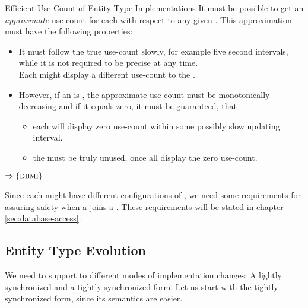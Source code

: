 \documentclass[a4paper, 12pt]{book}
\newcommand{\INTERFACE}[1]{$\Rightarrow\left\{#1\right\}$}
\begin{document}
\begin{samepage}\begin{requirement*}{Efficient Use-Count of Entity Type Implementations}
  It must be possible to get an \emph{approximate} use-count for each
   with respect to any given
  . This approximation must have the following properties: 
  \begin{itemize}
  \item It must follow the true use-count slowly, for example five second
    intervals, while it is not required to be precise at any time.\\
    Each  might display a different use-count to the
    . 
  \item However, if an  is , the
    approximate use-count must be monotonically decreasing and if it equals
    zero, it must be guaranteed, that 
    \begin{itemize}
    \item each  will display zero use-count within
      some possibly slow updating interval. 
    \item the  must be truly unused, once all
       display the zero use-count.
    \end{itemize}
  \end{itemize}
  \INTERFACE{\DBMI}
\end{requirement*}\end{samepage}


Since each  might have different configurations of
, we need some requirements for assuring
safety when a  joins a . These requirements will be stated in chapter \vref{sec:database-access}.


\subsection{Entity Type Evolution}

We need to support to different modes of implementation changes: A lightly
synchronized and a tightly synchronized form. Let us start with the tightly
synchronized form, since its semantics are easier.
\end{document}
